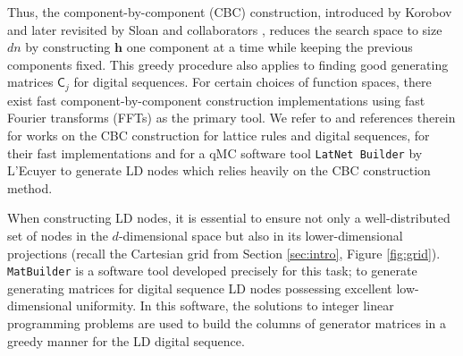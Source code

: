 \documentclass{svproc}
\begin{document}
Thus, the component-by-component (CBC) construction, introduced by Korobov \cite{kor63} and later revisited by Sloan and collaborators \cite{Slo02}, reduces the search space to size \(dn\) by constructing \(\boldsymbol{h}\) one component at a time while keeping the previous components fixed. This greedy procedure also applies to finding good generating matrices $\mathsf{C}_j$ for digital sequences.
For certain choices of function spaces, there exist fast component-by-component construction implementations using fast Fourier transforms (FFTs) as the primary tool. We refer to \cite{DicKuo04a,JoeKuo03,KuoJoe02b,DicEtal22a} and references therein for works on the CBC construction for lattice rules and digital sequences, \cite{NuyCoo06a,NuyCoo06b} for their fast implementations and \cite{LEcEtal22a,LatNet} for a qMC software tool \texttt{LatNet Builder} by L'Ecuyer to generate LD nodes which relies heavily on the CBC construction method.


When constructing LD nodes, it is essential to ensure not only a well-distributed set of nodes in the $d$-dimensional space but also in its lower-dimensional projections (recall the Cartesian grid from Section \ref{sec:intro}, Figure \ref{fig:grid}). \texttt{MatBuilder} \cite{paulin2022} is a software tool developed precisely for this task; to generate generating matrices for digital sequence LD nodes possessing excellent low-dimensional uniformity. In this software, the solutions to integer linear programming problems are used to build the columns of generator matrices in a greedy manner for the LD digital sequence.

\end{document}
